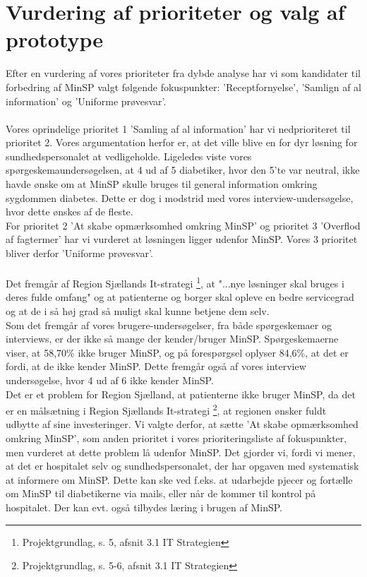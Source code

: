 \section{Vurdering af prioriteter og valg af prototype}
Efter en vurdering af vores prioriteter fra dybde analyse har vi som kandidater til forbedring af MinSP valgt følgende fokuspunkter: 'Receptfornyelse', 'Samlign af al information' og 'Uniforme prøvesvar'.
\\\\
Vores oprindelige prioritet 1 'Samling af al information' har vi nedprioriteret til prioritet 2. Vores argumentation herfor er, at det ville blive en for dyr løsning for sundhedspersonalet at vedligeholde. Ligeledes viste vores spørgeskemaundersøgelsen, at 4 ud af 5 diabetiker, hvor den 5'te var neutral, ikke havde ønske om at MinSP skulle bruges til general information omkring sygdommen diabetes. Dette er dog i modstrid med vores interview-undersøgelse, hvor dette ønskes af de fleste.\\
For prioritet 2 'At skabe opmærksomhed omkring MinSP' og prioritet 3 'Overflod af fagtermer' har vi vurderet at løsningen ligger udenfor MinSP. Vores 3 prioritet bliver derfor 'Uniforme prøvesvar'.
\\\\
Det fremgår af Region Sjællands It-strategi \footnote{Projektgrundlag, s. 5, afsnit 3.1 IT Strategien}, at "...nye løsninger skal bruges i deres fulde omfang" og at patienterne og borger skal opleve en bedre servicegrad og at de i så høj grad så muligt skal kunne betjene dem selv.\\
Som det fremgår af vores brugere-undersøgelser, fra både spørgeskemaer og interviews, er der ikke så mange der kender/bruger MinSP. Spørgeskemaerne viser, at 58,70\% ikke bruger MinSP, og på forespørgsel oplyser 84,6\%, at det er fordi, at de ikke kender MinSP. Dette fremgår også af vores interview undersøgelse, hvor 4 ud af 6 ikke kender MinSP.\\
Det er et problem for Region Sjælland, at patienterne ikke bruger MinSP, da det er en målsætning i Region Sjællands It-strategi \footnote{Projektgrundlag, s. 5-6, afsnit 3.1 IT Strategien}, at regionen ønsker fuldt udbytte af sine investeringer. 
Vi valgte derfor, at sætte 'At skabe opmærksomhed omkring MinSP', som anden prioritet i vores prioriteringsliste af fokuspunkter, men vurderet at dette problem lå udenfor MinSP. Det gjorder vi, fordi vi mener, at det er hospitalet selv og sundhedspersonalet, der har opgaven med systematisk at informere om MinSP. Dette kan ske ved f.eks. at udarbejde pjecer og fortælle om MinSP til diabetikerne via mails, eller når de kommer til kontrol på hospitalet. Der kan evt. også tilbydes læring i brugen af MinSP.\\
